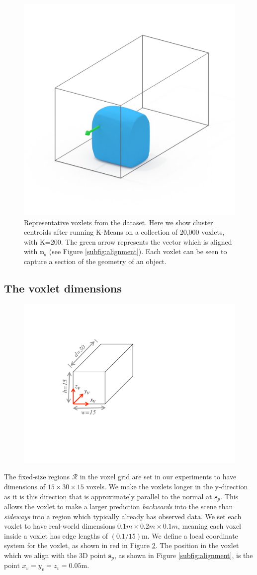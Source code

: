 \documentclass[10pt,twocolumn,letterpaper]{article}
\newcommand{\pixelidx}{\mathbf{s}}
\begin{document}
\begin{figure}
     \includegraphics[width=0.32\columnwidth, clip=true, trim=130 150 120 150]{data/all_voxlets_renders_white/44_marching_cubes.jpg}
     \caption{Representative voxlets from the dataset. Here we show cluster centroids after running K-Means on a collection of 20,000 voxlets, with K=200.
     The green arrow represents the vector which is aligned with $\mathbf{n}_\mathbf{s}$ (see Figure \ref{subfig:alignment}).
     Each voxlet can be seen to capture a section of the geometry of an object.}
     \label{fig:voxlets}
\end{figure}



\pagedepth\maxdimen
\subsection{The voxlet dimensions}
\begin{figure}
  \vspace{-30pt}
  \centering
    \includegraphics[width=0.35\columnwidth, clip=true, trim=120 140 340 80]{single_voxlet}
    \vspace{-15pt}
  \caption{}%
    \label{fig:voxlet_dims}
\end{figure}
The fixed-size regions $\mathcal{R}$ in the voxel grid are set in our experiments to have dimensions of $15 \times 30 \times 15$ voxels.
We make the voxlets longer in the y-direction as it is this direction that is approximately parallel to the normal at $\pixelidx_p$.
This allows the voxlet to make a larger prediction \emph{backwards} into the scene than \emph{sideways} into a region which typically already has observed data.
We set each voxlet to have real-world dimensions $0.1m \times 0.2m \times 0.1m$, meaning each voxel inside a voxlet has edge lengths of $(0.1 / 15)$m.
We define a local coordinate system for the voxlet, as shown in red in Figure \ref{fig:voxlet_dims}.
The position in the voxlet which we align with the 3D point $\pixelidx_p$, as shown in Figure \ref{subfig:alignment}, is the point $x_v = y_v = z_v = 0.05$m.
\end{document}
